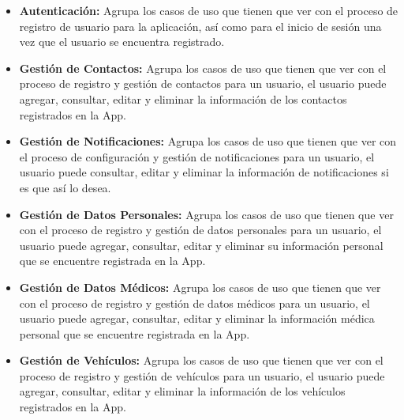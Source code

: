 \begin{itemize}
	\item {\bf Autenticación:} Agrupa los casos de uso que tienen que ver con el proceso de registro de usuario para la aplicación, así como para el inicio de sesión una vez que el usuario se encuentra registrado.
	
	\item {\bf Gestión de Contactos:} Agrupa los casos de uso que tienen que ver con el proceso de registro y gestión de contactos para un usuario, el usuario puede agregar, consultar, editar y eliminar la información de los contactos registrados en la App.
	
	\item {\bf Gestión de Notificaciones:} Agrupa los casos de uso que tienen que ver con el proceso de configuración y gestión de notificaciones para un usuario, el usuario puede consultar, editar y eliminar la información de notificaciones si es que así lo desea.
	
	\item {\bf Gestión de Datos Personales:} Agrupa los casos de uso que tienen que ver con el proceso de registro y gestión de datos personales para un usuario, el usuario puede agregar, consultar, editar y eliminar su información personal que se encuentre registrada en la App.
	
	\item {\bf Gestión de Datos Médicos:} Agrupa los casos de uso que tienen que ver con el proceso de registro y gestión de datos médicos para un usuario, el usuario puede agregar, consultar, editar y eliminar la información médica personal que se encuentre registrada en la App.
	
	\item {\bf Gestión de Vehículos:} Agrupa los casos de uso que tienen que ver con el proceso de registro y gestión de vehículos para un usuario, el usuario puede agregar, consultar, editar y eliminar la información de los vehículos registrados en la App.
\end{itemize}